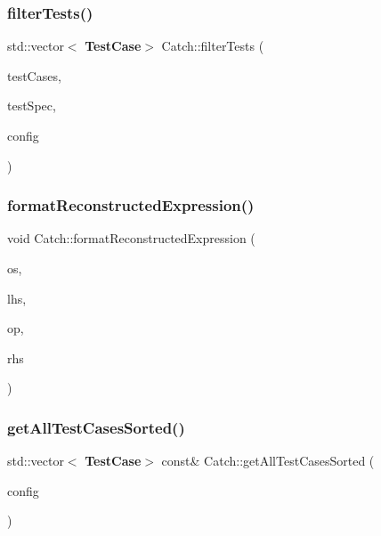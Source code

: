 \mbox{\label{namespace_catch_ab5da9aa67c42a3f626aea07d0b556829}} 
\subsubsection{filterTests()}
{\footnotesize\ttfamily std\+::vector$<$\textbf{ Test\+Case}$>$ Catch\+::filter\+Tests (\begin{DoxyParamCaption}\item[{std\+::vector$<$ \textbf{ Test\+Case} $>$ const \&}]{test\+Cases,  }\item[{Test\+Spec const \&}]{test\+Spec,  }\item[{\textbf{ I\+Config} const \&}]{config }\end{DoxyParamCaption})}

\mbox{\label{namespace_catch_a520110c31f26cf9892595772ab814fc0}} 
\subsubsection{formatReconstructedExpression()}
{\footnotesize\ttfamily void Catch\+::format\+Reconstructed\+Expression (\begin{DoxyParamCaption}\item[{std\+::ostream \&}]{os,  }\item[{std\+::string const \&}]{lhs,  }\item[{\textbf{ String\+Ref}}]{op,  }\item[{std\+::string const \&}]{rhs }\end{DoxyParamCaption})}

\mbox{\label{namespace_catch_a1c9b1a23bc947ea70ddaabf067276cf2}} 
\subsubsection{getAllTestCasesSorted()}
{\footnotesize\ttfamily std\+::vector$<$\textbf{ Test\+Case}$>$ const\& Catch\+::get\+All\+Test\+Cases\+Sorted (\begin{DoxyParamCaption}\item[{\textbf{ I\+Config} const \&}]{config }\end{DoxyParamCaption})}

